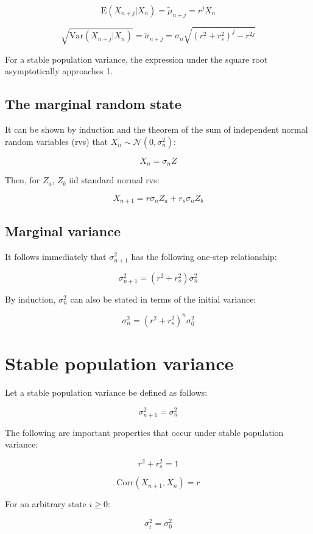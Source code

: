 \documentclass[a4paper,11pt]{article}
\begin{document}
$$\mathrm{E}(X_{n+j}|X_n) = \tilde{\mu}_{n+j} = r^jX_n$$

$$\sqrt{\mathrm{Var}(X_{n+j}|X_n)} = \tilde{\sigma}_{n+j} = \sigma_n \sqrt{(r^2+r_s^2)^j - r^{2j}}$$

For a stable population variance, the expression under the square root asymptotically approaches 1.







\subsection{The marginal random state}
It can be shown by induction and the theorem of the sum of independent normal random variables (rvs) that $X_n \sim \mathcal{N}(0, \sigma_n^2)$:

$$X_n = \sigma_nZ$$

Then, for $Z_a$, $Z_b$ iid standard normal rvs:

$$X_{n+1} = r\sigma_nZ_a + r_s\sigma_nZ_b$$



\subsection{Marginal variance}
It follows immediately that $\sigma_{n+1}^2$ has the following one-step relationship:

$$\sigma_{n+1}^2 = (r^2+r_s^2)  \sigma_n^2$$

By induction, $\sigma_n^2$ can also be stated in terms of the initial variance:

$$\sigma_n^2 = (r^2+r_s^2)^n  \sigma_{0}^2$$






\section{Stable population variance}
Let a stable population variance be defined as follows:

$$\sigma_{n+1}^2 = \sigma_n^2$$

The following are important properties that occur under stable population variance:

$$r^2+r_s^2 = 1$$

$$\mathrm{Corr}(X_{n+1}, X_n) = r$$

For an arbitrary state $i \ge 0$:

$$\sigma_i^2 = \sigma_{0}^2$$
\end{document}
